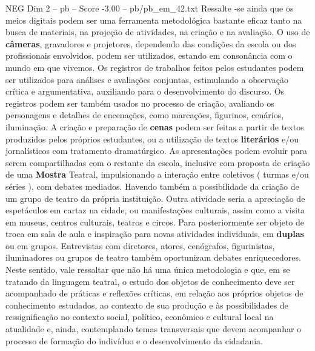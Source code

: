 \begin{textsample}{NEG Dim 2 – pb – Score -3.00 – pb/pb\_em\_42.txt}
Ressalte -se ainda que os meios digitais podem ser uma ferramenta metodológica bastante eficaz tanto na busca de materiais, na projeção de atividades, na criação e na avaliação.
O uso de \textbf{câmeras}, gravadores e projetores, dependendo das condições da escola ou dos profissionais envolvidos, podem ser utilizados, estando em consonância com o mundo em que vivemos.
Os registros de trabalhos feitos pelos estudantes podem ser utilizados para análises e avaliações conjuntas, estimulando a observação crítica e argumentativa, auxiliando para o desenvolvimento do discurso.
Os registros podem ser também usados no processo de criação, avaliando os personagens e detalhes de encenações, como marcações, figurinos, cenários, iluminação.
A criação e preparação de \textbf{cenas} podem ser feitas a partir de textos produzidos pelos próprios estudantes, ou a utilização de textos \textbf{literários} e/ou jornalísticos com tratamento dramatúrgico.
As apresentações podem evoluir para serem compartilhadas com o restante da escola, inclusive com proposta de criação de uma \textbf{Mostra} Teatral, impulsionando a interação entre coletivos ( turmas e/ou séries ), com debates mediados.
Havendo também a possibilidade da criação de um grupo de teatro da própria instituição.
Outra atividade seria a apreciação de espetáculos em cartaz na cidade, ou manifestações culturais, assim como a visita em museus, centros culturais, teatros e circos.
Para posteriormente ser objeto de troca em sala de aula e inspiração para novas atividades individuais, em \textbf{duplas} ou em grupos.
Entrevistas com diretores, atores, cenógrafos, figurinistas, iluminadores ou grupos de teatro também oportunizam debates enriquecedores.
Neste sentido, vale ressaltar que não há uma única metodologia e que, em se tratando da linguagem teatral, o estudo dos objetos de conhecimento deve ser acompanhado de práticas e reflexões críticas, em relação aos próprios objetos de conhecimento estudados, ao contexto de sua produção e às possibilidades de ressignificação no contexto social, político, econômico e cultural local na atualidade e, ainda, contemplando temas transversais que devem acompanhar o processo de formação do indivíduo e o desenvolvimento da cidadania.

\end{textsample}
